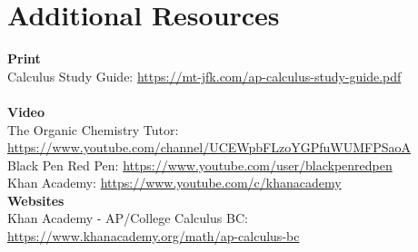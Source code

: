\documentclass[12pt, letterpaper]{article}
\begin{document}
\pagebreak

\section{Additional Resources}
\textbf{Print}\\
Calculus Study Guide: \url{https://mt-jfk.com/ap-calculus-study-guide.pdf}\\
\\
\textbf{Video}\\
The Organic Chemistry Tutor: \url{https://www.youtube.com/channel/UCEWpbFLzoYGPfuWUMFPSaoA}\\
Black Pen Red Pen: \url{https://www.youtube.com/user/blackpenredpen}\\
Khan Academy: \url{https://www.youtube.com/c/khanacademy}
\\
\textbf{Websites}\\
Khan Academy - AP/College Calculus BC: \url{https://www.khanacademy.org/math/ap-calculus-bc}
\end{document}
